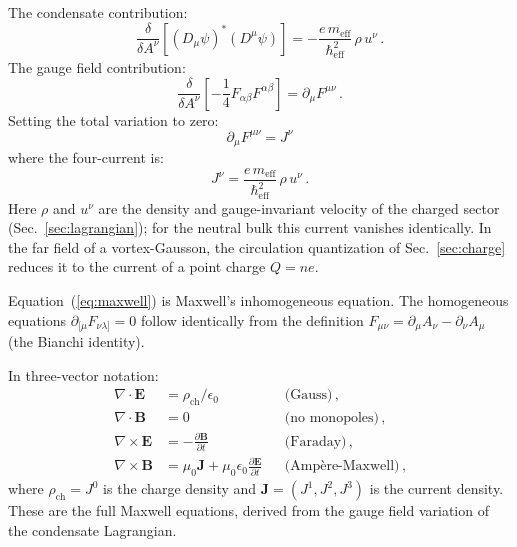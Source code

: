 \documentclass[12pt, a4paper]{article}
\newcommand{\meff}{m_{\mathrm{eff}}}
\newcommand{\heff}{\hbar_{\mathrm{eff}}}
\begin{document}
The condensate contribution:
\begin{equation}
    \frac{\delta}{\delta A^\nu}
    \left[(D_\mu\psi)^*(D^\mu\psi)\right]
    = -\frac{e\,\meff}{\heff^2}\,\rho\,u^\nu\,.
\end{equation}
The gauge field contribution:
\begin{equation}
    \frac{\delta}{\delta A^\nu}
    \left[-\frac{1}{4}F_{\alpha\beta}F^{\alpha\beta}\right]
    = \partial_\mu F^{\mu\nu}\,.
\end{equation}
Setting the total variation to zero:
\begin{equation}
    \boxed{\;\partial_\mu F^{\mu\nu} = J^\nu\;}
\label{eq:maxwell}
\end{equation}
where the four-current is:
\begin{equation}
    J^\nu = \frac{e\,\meff}{\heff^2}\,\rho\,u^\nu\,.
\label{eq:current}
\end{equation}
Here $\rho$ and $u^\nu$ are the density and gauge-invariant velocity of the charged sector (Sec.~\ref{sec:lagrangian}); for the neutral bulk this current vanishes identically. In the far field of a vortex-Gausson, the circulation quantization of Sec.~\ref{sec:charge} reduces it to the current of a point charge $Q = ne$.

Equation~(\ref{eq:maxwell}) is Maxwell's inhomogeneous equation. The homogeneous equations $\partial_{[\mu}F_{\nu\lambda]} = 0$ follow identically from the definition $F_{\mu\nu} = \partial_\mu A_\nu - \partial_\nu A_\mu$ (the Bianchi identity).

In three-vector notation:
\begin{align}
    \nabla\cdot\mathbf{E} &= \rho_{\mathrm{ch}}/\epsilon_0
    && \text{(Gauss)}\,,\label{eq:gauss}\\
    \nabla\cdot\mathbf{B} &= 0
    && \text{(no monopoles)}\,,\\
    \nabla\times\mathbf{E} &= -\frac{\partial\mathbf{B}}
    {\partial t}
    && \text{(Faraday)}\,,\\
    \nabla\times\mathbf{B} &= \mu_0\mathbf{J}
    + \mu_0\epsilon_0\frac{\partial\mathbf{E}}{\partial t}
    && \text{(Amp\`{e}re-Maxwell)}\,,\label{eq:ampere}
\end{align}
where $\rho_{\mathrm{ch}} = J^0$ is the charge density and $\mathbf{J} = (J^1, J^2, J^3)$ is the current density. These are the full Maxwell equations, derived from the gauge field variation of the condensate Lagrangian.


\end{document}

